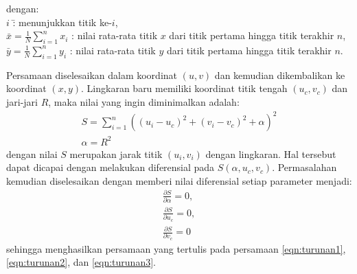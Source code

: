  \begin{tabbing}
dengan: \=\\
    \>$i$ \qquad \qquad \qquad \=: menunjukkan titik ke-$i$,\\ 
    \>$\bar{x}=\frac{1}{N}\sum_{i=1}^n x_i$      \>: nilai rata-rata titik $x$ dari titik pertama hingga titik terakhir $n$,\\
    \>$\bar{y}=\frac{1}{N}\sum_{i=1}^n y_i$      \>: nilai rata-rata titik $y$ dari titik pertama hingga titik terakhir $n$.
 \end{tabbing}
Persamaan diselesaikan dalam koordinat $(u,v)$ dan kemudian dikembalikan ke koordinat $(x,y)$. Lingkaran baru memiliki koordinat titik tengah $(u_c, v_c)$ dan jari-jari $R$, maka nilai yang ingin diminimalkan adalah:
\begin{equation}
    \begin{gathered}
        S=\sum_{i=1}^n ((u_i-u_c)^2+(v_i-v_c)^2+\alpha)^2\\
        \alpha=R^2
        \label{eqn:yang_diminimalkan}
    \end{gathered} 
\end{equation}
dengan nilai $S$ merupakan jarak titik $(u_i, v_i)$ dengan lingkaran. Hal tersebut dapat dicapai dengan melakukan diferensial pada $S(\alpha, u_c, v_c)$. Permasalahan kemudian diselesaikan dengan memberi nilai diferensial setiap parameter menjadi:
\begin{equation}
    \begin{gathered}
        \frac{\partial S}{\partial \alpha} =0,\\ 
        \frac{\partial S}{\partial u_c} =0,\\
        \frac{\partial S}{\partial v_c} =0
        \label{eqn:yang_diferensial}
    \end{gathered} 
\end{equation}
sehingga menghasilkan persamaan yang tertulis pada persamaan \ref*{eqn:turunan1}, \ref*{eqn:turunan2}, dan \ref*{eqn:turunan3}.

